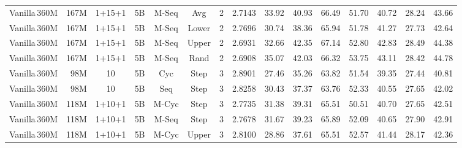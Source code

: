 \begin{table}[h!]
{\begin{tabular}{l|ccc|ccc|c|cccccc|c}
    Vanilla\,360M & 167M & 1+15+1 & 5B & M-Seq  & Avg & 2  & 2.7143 & 33.92 & 40.93 & 66.49 & 51.70 & 40.72 & 28.24 & 43.66   \\
    Vanilla\,360M & 167M & 1+15+1 & 5B & M-Seq & Lower & 2  & 2.7696 & 30.74 & 38.36 & 65.94 & 51.78 & 41.27 & 27.73 & 42.64  \\
    Vanilla\,360M & 167M & 1+15+1 & 5B & M-Seq  & Upper & 2  & 2.6931 & 32.66 & 42.35 & 67.14 & 52.80 & 42.83 & 28.49 & 44.38  \\
    Vanilla\,360M & 167M & 1+15+1 & 5B & M-Seq  & Rand & 2  & 2.6908 & 35.07 & 42.03 & 66.32 & 53.75 & 43.11 & 28.42 & 44.78  \\
    \midrule
    Vanilla\,360M & \,\,\,98M & 10 & 5B & Cyc  & Step & 3  & 2.8901 & 27.46 & 35.26 & 63.82 & 51.54 & 39.35 & 27.44 & 40.81  \\
    Vanilla\,360M & \,\,\,98M & 10 & 5B & Seq & Step & 3  & 2.8258 & 30.43 & 37.37 & 63.76 & 52.33 & 40.55 & 27.65 & 42.02  \\
     \rowcolor[gray]{0.9}
    Vanilla\,360M & 118M & 1+10+1 & 5B & M-Cyc  & Step & 3  & 2.7735 & 31.38 & 39.31 & 65.51 & 50.51 & 40.70 & 27.65 & 42.51  \\
     \rowcolor[gray]{0.9}
    Vanilla\,360M & 118M & 1+10+1 & 5B & M-Seq  & Step & 3  & 2.7678 & 31.67 & 39.23 & 65.89 & 52.09 & 40.65 & 27.90 & 42.91  \\
    Vanilla\,360M & 118M & 1+10+1 & 5B & M-Cyc  & Upper & 3  & 2.8100 & 28.86 & 37.61 & 65.51 & 52.57 & 41.44 & 28.17 & 42.36  \\
    \bottomrule
    \end{tabular}
    }
\end{table}